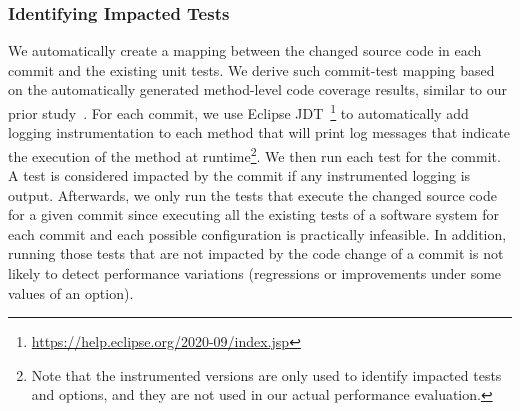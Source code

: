\subsubsection{Identifying Impacted Tests}
\label{sec:impactedtests}
We automatically create a mapping between the changed source code in each commit and the existing unit tests. %
We derive such commit-test mapping based on the automatically generated method-level code coverage results, similar to our prior study~\cite{jinfu_tse2020}. %
For each commit, we use Eclipse JDT~\footnote{\url{https://help.eclipse.org/2020-09/index.jsp}} to automatically add logging instrumentation to each method that will print log messages that indicate the execution of the method at runtime\footnote{Note that the instrumented versions are only used to identify impacted tests and options, and they are not used in our actual performance evaluation.}.
We then run each test for the commit. A test is considered impacted by the commit if any instrumented logging is output.
Afterwards, we only run the tests that execute the changed source code for a given commit since executing all the existing tests of a software system for each commit and each possible configuration is practically infeasible. In addition, running those tests that are not impacted by the code change of a commit is not likely to detect performance variations (regressions or improvements under some values of an option). 


